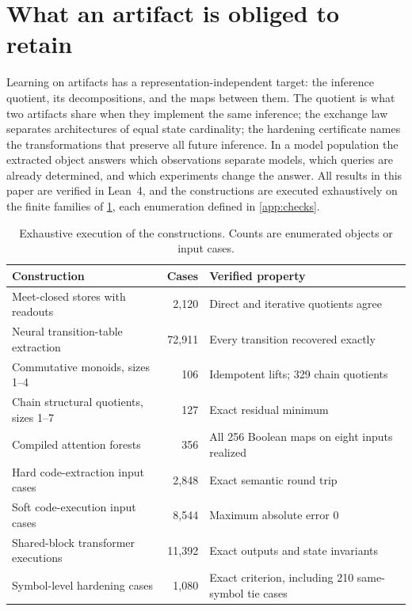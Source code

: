 \documentclass{article}
\theoremstyle{definition}
\begin{document}
\section{What an artifact is obliged to retain}\label{sec:checks}
Learning on artifacts has a representation-independent target: the inference quotient, its decompositions, and the maps between them. The quotient is what two artifacts share when they implement the same inference; the exchange law separates architectures of equal state cardinality; the hardening certificate names the transformations that preserve all future inference. In a model population \citep{schurholt2022modelzoos} the extracted object answers which observations separate models, which queries are already determined, and which experiments change the answer. All results in this paper are verified in Lean~4, and the constructions are executed exhaustively on the finite families of \cref{tab:checks}, each enumeration defined in \cref{app:checks}.

\begin{table}[t]
\caption{Exhaustive execution of the constructions. Counts are enumerated objects or input cases.}
\label{tab:checks}
\centering
\small
\begin{tabular}{@{}>{\raggedright\arraybackslash}p{.47\linewidth}r >{\raggedright\arraybackslash}p{.30\linewidth}@{}}
\toprule
Construction & Cases & Verified property\\
\midrule
Meet-closed stores with readouts & 2,120 & Direct and iterative quotients agree\\
Neural transition-table extraction & 72,911 & Every transition recovered exactly\\
Commutative monoids, sizes 1--4 & 106 & Idempotent lifts; 329 chain quotients\\
Chain structural quotients, sizes 1--7 & 127 & Exact residual minimum\\
Compiled attention forests & 356 & All 256 Boolean maps on eight inputs realized\\
Hard code-extraction input cases & 2,848 & Exact semantic round trip\\
Soft code-execution input cases & 8,544 & Maximum absolute error $0$\\
Shared-block transformer executions & 11,392 & Exact outputs and state invariants\\
Symbol-level hardening cases & 1,080 & Exact criterion, including 210 same-symbol tie cases\\
\bottomrule
\end{tabular}
\end{table}
\end{document}
